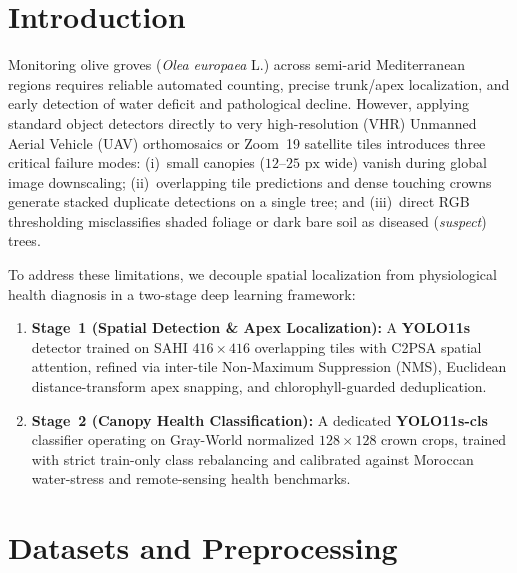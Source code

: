 \documentclass[runningheads]{llncs}
\begin{document}
\section{Introduction}
Monitoring olive groves (\textit{Olea europaea} L.) across semi-arid Mediterranean regions requires reliable automated counting, precise trunk/apex localization, and early detection of water deficit and pathological decline. However, applying standard object detectors directly to very high-resolution (VHR) Unmanned Aerial Vehicle (UAV) orthomosaics or Zoom~19 satellite tiles introduces three critical failure modes: (i)~small canopies ($12$--$25\text{ px}$ wide) vanish during global image downscaling; (ii)~overlapping tile predictions and dense touching crowns generate stacked duplicate detections on a single tree; and (iii)~direct RGB thresholding misclassifies shaded foliage or dark bare soil as diseased (\textit{suspect}) trees.

To address these limitations, we decouple spatial localization from physiological health diagnosis in a two-stage deep learning framework:
\begin{enumerate}
    \item \textbf{Stage~1 (Spatial Detection \& Apex Localization):} A \textbf{YOLO11s} detector trained on SAHI $416\times416$ overlapping tiles with C2PSA spatial attention, refined via inter-tile Non-Maximum Suppression (NMS), Euclidean distance-transform apex snapping, and chlorophyll-guarded deduplication.
    \item \textbf{Stage~2 (Canopy Health Classification):} A dedicated \textbf{YOLO11s-cls} classifier operating on Gray-World normalized $128\times128$ crown crops, trained with strict train-only class rebalancing and calibrated against Moroccan water-stress and remote-sensing health benchmarks.
\end{enumerate}

\section{Datasets and Preprocessing}
\end{document}
